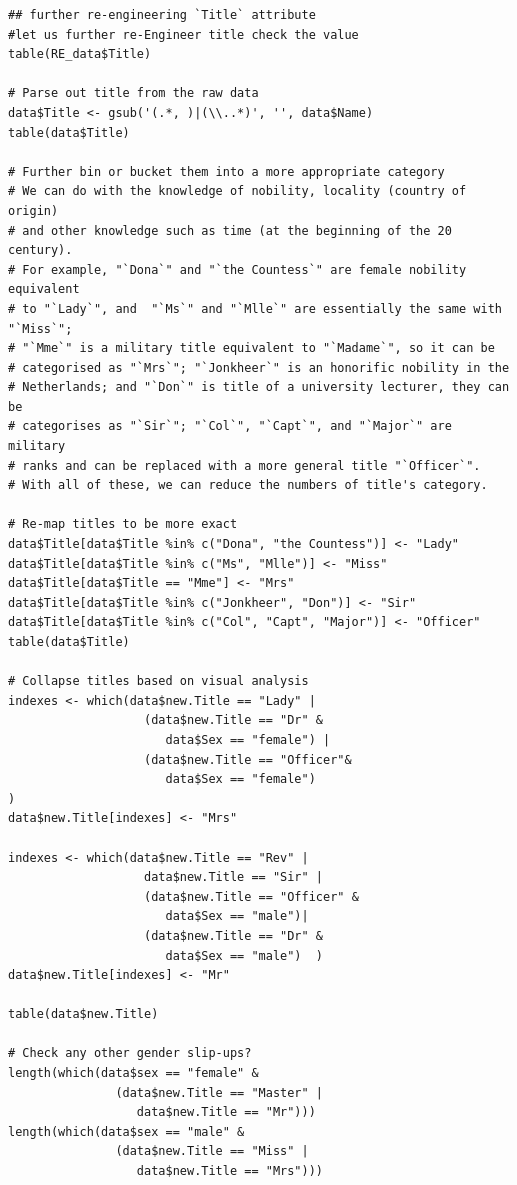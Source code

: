 \documentclass[
]{book}
\begin{document}
\begin{verbatim}
## further re-engineering `Title` attribute
#let us further re-Engineer title check the value
table(RE_data$Title)

# Parse out title from the raw data
data$Title <- gsub('(.*, )|(\\..*)', '', data$Name)
table(data$Title)

# Further bin or bucket them into a more appropriate category
# We can do with the knowledge of nobility, locality (country of origin)
# and other knowledge such as time (at the beginning of the 20 century).
# For example, "`Dona`" and "`the Countess`" are female nobility equivalent
# to "`Lady`", and  "`Ms`" and "`Mlle`" are essentially the same with "`Miss`";
# "`Mme`" is a military title equivalent to "`Madame`", so it can be
# categorised as "`Mrs`"; "`Jonkheer`" is an honorific nobility in the
# Netherlands; and "`Don`" is title of a university lecturer, they can be
# categorises as "`Sir`"; "`Col`", "`Capt`", and "`Major`" are military
# ranks and can be replaced with a more general title "`Officer`".
# With all of these, we can reduce the numbers of title's category.

# Re-map titles to be more exact
data$Title[data$Title %in% c("Dona", "the Countess")] <- "Lady"
data$Title[data$Title %in% c("Ms", "Mlle")] <- "Miss"
data$Title[data$Title == "Mme"] <- "Mrs"
data$Title[data$Title %in% c("Jonkheer", "Don")] <- "Sir"
data$Title[data$Title %in% c("Col", "Capt", "Major")] <- "Officer"
table(data$Title)

# Collapse titles based on visual analysis
indexes <- which(data$new.Title == "Lady" |
                   (data$new.Title == "Dr" &
                      data$Sex == "female") |
                   (data$new.Title == "Officer"&
                      data$Sex == "female")
)
data$new.Title[indexes] <- "Mrs"

indexes <- which(data$new.Title == "Rev" |
                   data$new.Title == "Sir" |
                   (data$new.Title == "Officer" &
                      data$Sex == "male")|
                   (data$new.Title == "Dr" &
                      data$Sex == "male")  )
data$new.Title[indexes] <- "Mr"

table(data$new.Title)

# Check any other gender slip-ups?
length(which(data$sex == "female" &
               (data$new.Title == "Master" |
                  data$new.Title == "Mr")))
length(which(data$sex == "male" &
               (data$new.Title == "Miss" |
                  data$new.Title == "Mrs")))


\end{verbatim}
\end{document}
